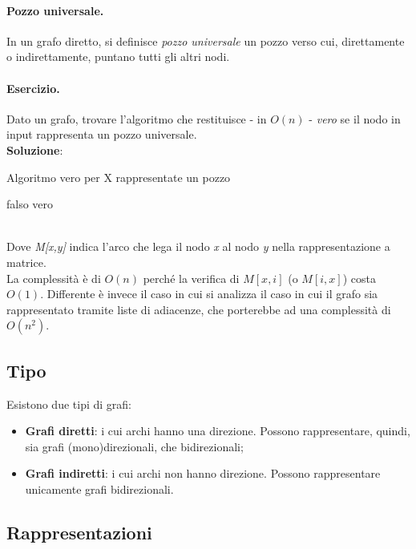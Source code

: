 \paragraph{Pozzo universale.}
In un grafo diretto, si definisce \textit{pozzo universale} un pozzo verso cui, direttamente o indirettamente, puntano tutti gli altri nodi.
\paragraph{Esercizio.}
Dato un grafo, trovare l'algoritmo che restituisce - in $O(n)$ - \textit{vero} se il nodo in input rappresenta un pozzo universale. \\
\textbf{Soluzione}:
\begin{algorithm}
	\caption{Algoritmo vero per X rappresentate un pozzo}\label{alg:pozzo-x}
	\begin{algorithmic}[1]
					\State \Return falso
				\EndIf
			\EndFor
			\State \Return vero
		\EndFunction
	\end{algorithmic}
\end{algorithm} \hfill \\
Dove \textit{M[x,y]} indica l'arco che lega il nodo \textit{x} al nodo \textit{y} nella rappresentazione a matrice. \\
La complessità è di $O(n)$ perché la verifica di $M[x,i]$ (o $M[i,x]$) costa $O(1)$. Differente è invece il caso in cui si analizza il caso in cui il grafo sia rappresentato tramite liste di adiacenze, che porterebbe ad una complessità di $O(n^2)$.

\subsection{Tipo}
Esistono due tipi di grafi:
\begin{itemize}
    \item \textbf{Grafi diretti}: i cui archi hanno una direzione. Possono rappresentare, quindi, sia grafi (mono)direzionali, che bidirezionali;
    \item \textbf{Grafi indiretti}: i cui archi non hanno direzione. Possono rappresentare unicamente grafi bidirezionali.
\end{itemize}

\newpage

\subsection{Rappresentazioni}
